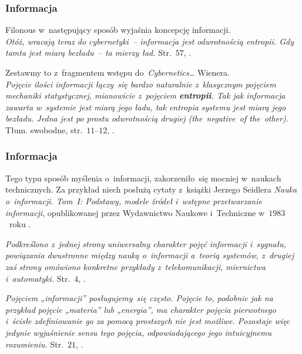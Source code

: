 \documentclass[10pt,t]{beamer}
\begin{document}
\begin{frame}
  \frametitle{Informacja}


  Filonous w~następujący sposób wyjaśnia koncepcję informacji. \\

  \textit{Otóż, wracają teraz do cybernetyki~-- informacja jest odwrotnością
    entropii. Gdy tamta jest miarą bezładu~-- ta mierzy ład.}
  Str.~$57$, \parencite{Lem-Dialogi-Vol-I-Pub-1996}.

  Zestawmy to z~fragmentem wstępu do~\textit{Cybernetics\ldots} Wienera. \\
  \textit{Pojęcie ilości informacji łączy~się bardzo naturalnie
    z~klasycznym pojęciem mechaniki statystycznej, mianowicie z~pojęciem
    \textbf{entropii}. Tak jak informacja zawarta w~systemie jest miarą jego
    ładu, tak entropia systemu jest miarą jego bezładu. Jedna jest po
    prostu odwrotnością drugiej (the~negative~of the~other).}
  Tłum. swobodne, str.~$11\text{--}12$,
  \parencite{Wiener-Cybernetics-Second-edition-Pub-2016}.

\end{frame}





\begin{frame}
  \frametitle{Informacja}


  Tego typu sposób myślenia o~informacji, zakorzeniło~się mocniej
  w~naukach technicznych. Za przykład niech posłużą cytaty z~książki
  Jerzego Seidlera
  \textit{Nauka o~informacji. Tom~I: Podstawy, modele źródeł i~wstępne
    przetwarzanie informacji}, opublikowanej przez Wydawnictwo Naukowe
  i~Techniczne w~$1983$~roku
  \parencite{Seidler-Nauka-o-informacji-Vol-I-Pub-1983}.

  \textit{Podkreślono z~jednej strony uniwersalny charakter pojęć
    informacji i~sygnału, powiązania dwustronne między nauką o~informacji
    a~teorią systemów, z~drugiej zaś strony omówiono konkretne przykłady
    z~telekomunikacji, miernictwa i~automatyki.} Str.~$4$,
  \parencite{Seidler-Nauka-o-informacji-Vol-I-Pub-1983}.

  \textit{Pojęciem „informacji” posługujemy~się często. Pojęcie to,
    podobnie jak na przykład pojęcie „materia” lub „energia”, ma charakter
    pojęcia pierwotnego i~ścisłe zdefiniowanie go za pomocą prostszych nie
    jest możliwe. Pozostaje więc jedynie wyjaśnienie sensu tego pojęcia,
    odpowiadającego jego intuicyjnemu rozumieniu.} Str.~$21$,
  \parencite{Seidler-Nauka-o-informacji-Vol-I-Pub-1983}.

\end{frame}
\end{document}
